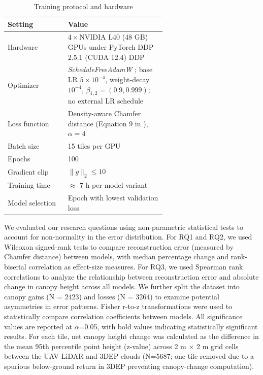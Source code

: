 \documentclass[12pt]{report}
\begin{document}
\begin{table}[htbp]
  \centering
  \caption{Training protocol and hardware}
  \label{tab:training_protocol}
  \begin{tabular}{lp{0.62\linewidth}}
    \toprule
    \textbf{Setting} & \textbf{Value} \\
    \midrule
    Hardware      & 4\,×\,NVIDIA L40 (48 GB) GPUs under PyTorch DDP 2.5.1 (CUDA 12.4)
 DDP \\
    Optimizer     & \textit{ScheduleFreeAdamW} \cite{defazio_road_2024}; base LR $5\times10^{-4}$, weight-decay $10^{-4}$, $\beta_{1,2}=(0.9,0.999)$; no external LR schedule \\
    Loss function & Density-aware Chamfer distance (Equation 9 in \cite{wu_density-aware_2021}), $\alpha=4$ \\
    Batch size    & 15 tiles per GPU \\
    Epochs        & 100 \\
    Gradient clip & $\lVert g\rVert_2 \le 10$ \\
    Training time & $\approx$ 7 h per model variant \\
    Model selection & Epoch with lowest validation loss \\
    \bottomrule
  \end{tabular}
\end{table}

\vspace{-3pt}

We evaluated our research questions using non-parametric statistical tests to account for non-normality in the error distribution. For RQ1 and RQ2, we used Wilcoxon signed-rank tests to compare reconstruction error (measured by Chamfer distance) between models, with median percentage change and rank-biserial correlation as effect-size measures. For RQ3, we used Spearman rank correlations to analyze the relationship between reconstruction error and absolute change in canopy height across all models. We further split the dataset into canopy gains (N = 2423) and losses (N = 3264) to examine potential asymmetries in error patterns. Fisher r-to-z transformations were used to statistically compare correlation coefficients between models. All significance values are reported at $\alpha$=0.05, with bold values indicating statistically significant results.
For each tile, net canopy height change was calculated as the difference in the mean 95th percentile point height (z-value) across 2 m × 2 m grid cells between the UAV LiDAR and 3DEP clouds (N=5687; one tile removed due to a spurious below-ground return in 3DEP preventing canopy-change computation).
\end{document}
